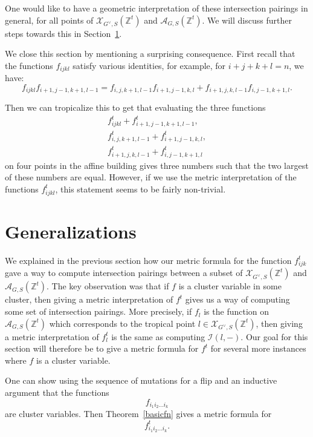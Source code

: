\documentclass[ALCO,ThmDefs,Unicode,epreuves]{cedram}
\newcommand{\Zt}{\mathbb{Z}^t}
\newcommand{\A}{\mathcal{A}}
\newcommand{\X}{\mathcal{X}}
\newcommand{\I}{\mathcal{I}}
\newcommand{\vG}{G^\vee}
\begin{document}
One would like to have a geometric interpretation of these intersection pairings in general, for all points of $\X_{\vG,S}(\Zt)$ and $\A_{G,S}(\Zt)$. We will discuss further steps towards this in Section~\ref{sect6}.

\begin{rema} We close this section by mentioning a surprising consequence. First recall that the functions $f_{ijkl}$ satisfy various identities, for example, for $i+j+k+l=n$, we have:
\[
f_{ijkl} f_{i+1, j-1, k+1, l-1} = f_{i, j, k+1, l-1} f_{i+1, j-1, k, l} + f_{i+1, j, k, l-1} f_{i, j-1, k+1, l}.
\]

Then we can tropicalize this to get that evaluating the three functions
\begin{gather*}
f^t_{ijkl} + f^t_{i+1, j-1, k+1, l-1},
\\
f^t_{i, j, k+1, l-1} + f^t_{i+1, j-1, k, l},
\\
f^t_{i+1, j, k, l-1} + f^t_{i, j-1, k+1, l}
\end{gather*}
on four points in the affine building gives three numbers such that the two largest of these numbers are equal. However, if we use the metric interpretation of the functions $f^t_{ijkl}$, this statement seems to be fairly non-trivial.
\end{rema}

\section{Generalizations}\label{sect6}

We explained in the previous section how our metric formula for the function $f_{ijk}^t$ gave a way to compute intersection pairings between a subset of $\X_{\vG,S}(\Zt)$ and $\A_{G,S}(\Zt)$. The key observation was that if $f$ is a cluster variable in some cluster, then giving a metric interpretation of $f^t$ gives us a way of computing some set of intersection pairings. More precisely, if $f_l$ is the function on $\A_{G,S}(\Zt)$ which corresponds to the tropical point $l \in \X_{\vG,S}(\Zt)$, then giving a metric interpretation of $f_l^t$ is the same as computing $\I(l, -)$. Our goal for this section will therefore be to give a metric formula for $f^t$ for several more instances where $f$ is a cluster variable.

One can show using the sequence of mutations for a flip and an inductive argument that the functions 
\[
f_{i_1i_2\dots i_k}
\]
are cluster variables. Then Theorem~\ref{basicfn} gives a metric formula for 
\[
f_{i_1i_2\dots i_k}^t.
\]
\end{document}
